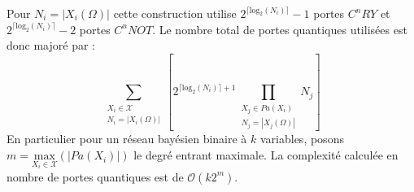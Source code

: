 Pour $N_i=|X_i(\Omega)|$ cette construction utilise $2^{\lceil \mathrm{log}_2(N_i) \rceil}-1$ portes $C^nRY$ et $2^{\lceil \mathrm{log}_2(N_i) \rceil}-2$ portes $C^nNOT$.
Le nombre total de portes quantiques utilisées est donc majoré par :
\[\sum_{\substack{X_i \in \mathcal{X} \\ N_i = |X_i(\Omega)|}}
\left[
2^{\lceil \mathrm{log}_2(N_i)\rceil+1} \prod_{\substack{X_j\in Pa(X_i) \\ N_j = |X_j(\Omega)|}}N_j 
\right] 
\]
En particulier pour un réseau bayésien binaire à $k$ variables, posons $m = \underset{X_i\in\mathcal{X}}{\mathrm{max}}(|Pa(X_i)|)$ le degré entrant maximale.  La complexité calculée en nombre de portes quantiques est de $\mathcal{O}(k2^m)$.
